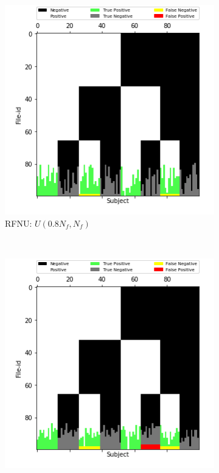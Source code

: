 \documentclass[10pt, conference, compsocconf]{IEEEtran}
\begin{document}
\begin{figure}
\centering
\begin{subfigure}[b]{0.4\columnwidth}
        \includegraphics[width=\columnwidth]{figures/RFNU_Syn_8_ALS_09_test_data_matrix_run1.png}
        \caption{RFNU: $U(0.8N_f, N_f)$}
        \label{fig:overlap-rfnu}
\end{subfigure}\\
\begin{subfigure}[b]{0.4\columnwidth}
        \includegraphics[width=\columnwidth]{figures/RFNT-L_Syn_8_ALS_09_test_data_matrix_run2.png}

\end{subfigure}
\end{figure}
\end{document}
